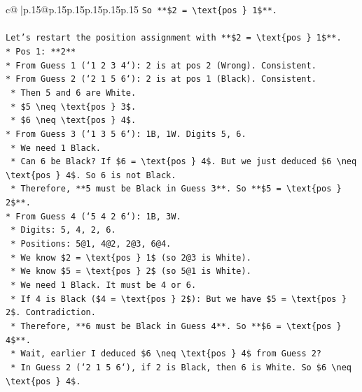 \documentclass{article}
\begin{document}
{\begin{supertabular}{c@{$\;$}|p{.15\linewidth}@{}p{.15\linewidth}p{.15\linewidth}p{.15\linewidth}p{.15\linewidth}p{.15\linewidth}}
{{{\texttt{So **\$2 = \textbackslash{}text\{pos \} 1\$**.} \\
\\ 
\texttt{Let's restart the position assignment with **\$2 = \textbackslash{}text\{pos \} 1\$**.} \\
\texttt{*   Pos 1: **2**} \\
\texttt{*   From Guess 1 (`1 2 3 4`): 2 is at pos 2 (Wrong). Consistent.} \\
\texttt{*   From Guess 2 (`2 1 5 6`): 2 is at pos 1 (Black). Consistent.} \\
\texttt{    *   Then 5 and 6 are White.} \\
\texttt{    *   \$5 \textbackslash{}neq \textbackslash{}text\{pos \} 3\$.} \\
\texttt{    *   \$6 \textbackslash{}neq \textbackslash{}text\{pos \} 4\$.} \\
\texttt{*   From Guess 3 (`1 3 5 6`): 1B, 1W. Digits 5, 6.} \\
\texttt{    *   We need 1 Black.} \\
\texttt{    *   Can 6 be Black? If \$6 = \textbackslash{}text\{pos \} 4\$. But we just deduced \$6 \textbackslash{}neq \textbackslash{}text\{pos \} 4\$. So 6 is not Black.} \\
\texttt{    *   Therefore, **5 must be Black in Guess 3**. So **\$5 = \textbackslash{}text\{pos \} 2\$**.} \\
\texttt{*   From Guess 4 (`5 4 2 6`): 1B, 3W.} \\
\texttt{    *   Digits: 5, 4, 2, 6.} \\
\texttt{    *   Positions: 5@1, 4@2, 2@3, 6@4.} \\
\texttt{    *   We know \$2 = \textbackslash{}text\{pos \} 1\$ (so 2@3 is White).} \\
\texttt{    *   We know \$5 = \textbackslash{}text\{pos \} 2\$ (so 5@1 is White).} \\
\texttt{    *   We need 1 Black. It must be 4 or 6.} \\
\texttt{    *   If 4 is Black (\$4 = \textbackslash{}text\{pos \} 2\$): But we have \$5 = \textbackslash{}text\{pos \} 2\$. Contradiction.} \\
\texttt{    *   Therefore, **6 must be Black in Guess 4**. So **\$6 = \textbackslash{}text\{pos \} 4\$**.} \\
\texttt{    *   Wait, earlier I deduced \$6 \textbackslash{}neq \textbackslash{}text\{pos \} 4\$ from Guess 2?} \\
\texttt{        *   In Guess 2 (`2 1 5 6`), if 2 is Black, then 6 is White. So \$6 \textbackslash{}neq \textbackslash{}text\{pos \} 4\$.} \\
}}}
\end{supertabular}}
\end{document}
